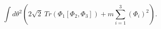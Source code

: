 \begin{equation}
\int d\theta^2 \left( 2\sqrt{2} \:
Tr(\Phi_1 [\Phi_2,\Phi_3]) + m \sum_{i=1}^3 (\Phi_i)^2 \right).
\label{pot1}\end{equation}

